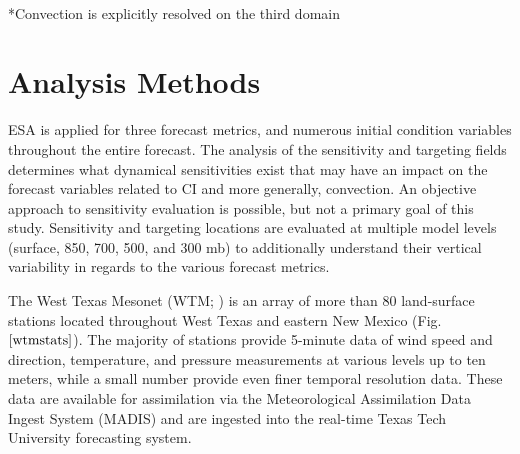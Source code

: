 \documentclass{ttuthes2007}
\newcommand{\tab}{\hspace*{2em}}  %
\begin{document}
\begin{table}[b] 
\caption{Model Parameterizations Used} 
\centering %
 \\
*Convection is explicitly resolved on the third domain
\label{params} %
\end{table} 

\section{Analysis Methods}

\tab ESA is applied for three forecast metrics, and numerous initial condition variables throughout the entire forecast. The analysis of the sensitivity and targeting fields determines what dynamical sensitivities exist that may have an impact on the forecast variables related to CI and more generally, convection. An objective approach to sensitivity evaluation is possible, but not a primary goal of this study. Sensitivity and targeting locations are evaluated at multiple model levels (surface, 850, 700, 500, and 300 mb) to additionally understand their vertical variability in regards to the various forecast metrics. 

\tab The West Texas Mesonet (WTM; \citealt{Schroederetal2005}) is an array of more than 80 land-surface stations located throughout West Texas and eastern New Mexico (Fig.~$\ref{wtmstats}$). The majority of stations provide 5-minute data of wind speed and direction, temperature, and pressure measurements at various levels up to ten meters, while a small number provide even finer temporal resolution data. These data are available for assimilation via the Meteorological Assimilation Data Ingest System (MADIS) and are ingested into the real-time Texas Tech University forecasting system. \\
\end{document}

